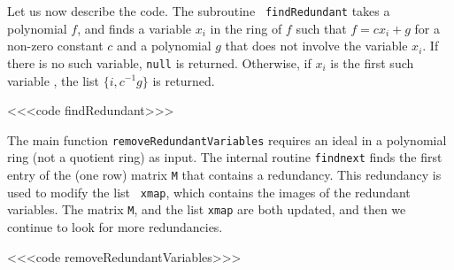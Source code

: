   Let us now describe the \Mtwo code.  The subroutine {\tt
    findRedundant} takes a polynomial $f$, and finds a variable $x_i$
  in the ring of $f$ such that $f = c x_i + g$ for a non-zero
  constant $c$ and a polynomial $g$ that does not involve the
  variable $x_i$.  If there is no such variable, {\tt null} is
  returned.  Otherwise, if $x_i$ is the first such variable , the list
  $\{i, c^{-1} g\}$ is returned.

<<<code findRedundant>>>

The main function {\tt removeRedundantVariables} requires an ideal in a
polynomial ring (not a quotient ring) as input.  The internal
routine {\tt findnext} finds the first entry of the (one row) matrix {\tt M}
that contains a redundancy.  This redundancy is used to modify the list {\tt
xmap}, which contains the images of the redundant variables.
The matrix {\tt M}, and the list {\tt xmap} are both updated, and 
then we continue to look for more redundancies.

<<<code removeRedundantVariables>>>
